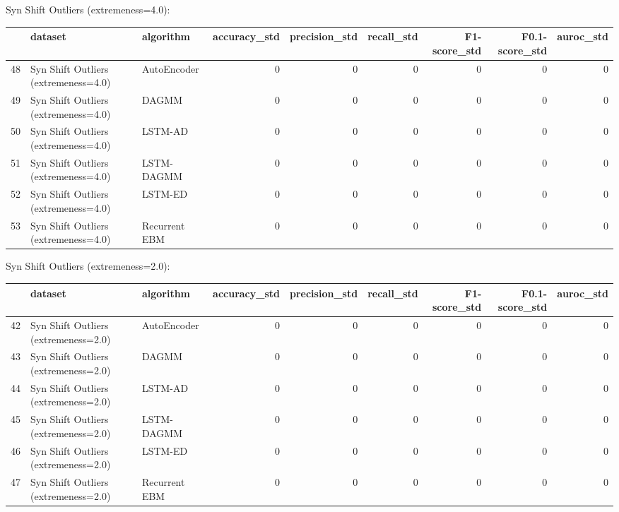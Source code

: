 Syn Shift Outliers (extremeness=4.0):

\begin{tabular}{rllrrrrrr}
\hline
    & dataset                              & algorithm     &   accuracy\_std &   precision\_std &   recall\_std &   F1-score\_std &   F0.1-score\_std &   auroc\_std \\
\hline
 48 & Syn Shift Outliers (extremeness=4.0) & AutoEncoder   &              0 &               0 &            0 &              0 &                0 &           0 \\
 49 & Syn Shift Outliers (extremeness=4.0) & DAGMM         &              0 &               0 &            0 &              0 &                0 &           0 \\
 50 & Syn Shift Outliers (extremeness=4.0) & LSTM-AD       &              0 &               0 &            0 &              0 &                0 &           0 \\
 51 & Syn Shift Outliers (extremeness=4.0) & LSTM-DAGMM    &              0 &               0 &            0 &              0 &                0 &           0 \\
 52 & Syn Shift Outliers (extremeness=4.0) & LSTM-ED       &              0 &               0 &            0 &              0 &                0 &           0 \\
 53 & Syn Shift Outliers (extremeness=4.0) & Recurrent EBM &              0 &               0 &            0 &              0 &                0 &           0 \\
\hline
\end{tabular}

Syn Shift Outliers (extremeness=2.0):

\begin{tabular}{rllrrrrrr}
\hline
    & dataset                              & algorithm     &   accuracy\_std &   precision\_std &   recall\_std &   F1-score\_std &   F0.1-score\_std &   auroc\_std \\
\hline
 42 & Syn Shift Outliers (extremeness=2.0) & AutoEncoder   &              0 &               0 &            0 &              0 &                0 &           0 \\
 43 & Syn Shift Outliers (extremeness=2.0) & DAGMM         &              0 &               0 &            0 &              0 &                0 &           0 \\
 44 & Syn Shift Outliers (extremeness=2.0) & LSTM-AD       &              0 &               0 &            0 &              0 &                0 &           0 \\
 45 & Syn Shift Outliers (extremeness=2.0) & LSTM-DAGMM    &              0 &               0 &            0 &              0 &                0 &           0 \\
 46 & Syn Shift Outliers (extremeness=2.0) & LSTM-ED       &              0 &               0 &            0 &              0 &                0 &           0 \\
 47 & Syn Shift Outliers (extremeness=2.0) & Recurrent EBM &              0 &               0 &            0 &              0 &                0 &           0 \\
\hline
\end{tabular}

